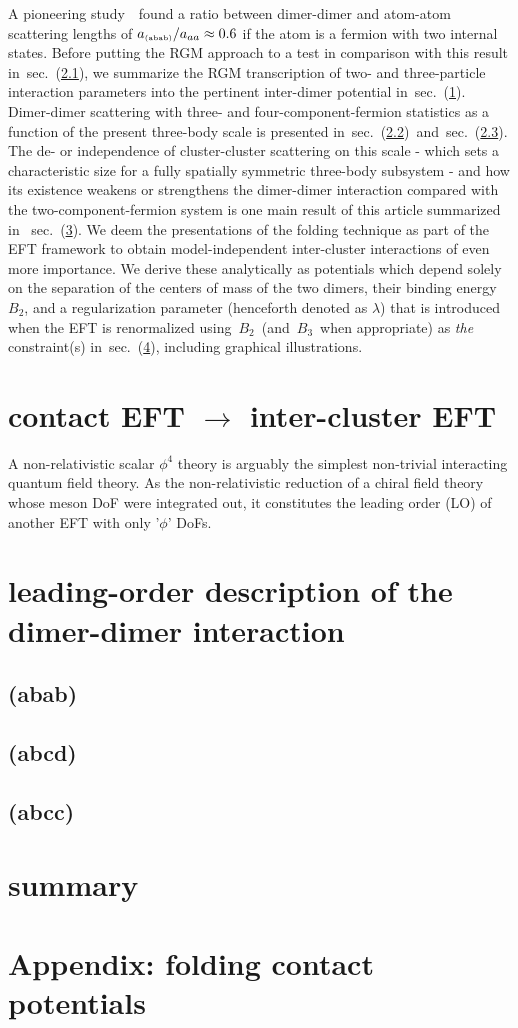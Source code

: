 \documentclass[preprint,aps,onecolumn,preprintnumbers,amsmath,amssymb,nofootinbib,superscriptaddress]{revtex4-1}
\newcommand{\secref}[1]{sec.~(\ref{#1})}
\newcommand{\add}{\ensuremath{a_\text{\tiny (abab)}}}
\newcommand{\bd}{\ensuremath{B_2}}
\newcommand{\bt}{\ensuremath{B_3}}
\begin{document}
A pioneering study~\cite{Petrov_2004}~found a ratio between dimer-dimer and atom-atom scattering lengths of $\add/a_{aa}\approx0.6$ if the
atom is a fermion with two internal states. Before putting the RGM approach to a test in comparison with this result in~\secref{sec.3}, we summarize the
RGM transcription of two- and three-particle interaction parameters into the pertinent inter-dimer potential in~\secref{sec.2}.
Dimer-dimer scattering with three- and four-component-fermion statistics 
as a function of the present three-body scale is presented in~\secref{sec.4}~and~\secref{sec.5}.
The de- or independence of cluster-cluster scattering on this scale - which sets a characteristic size for a fully spatially symmetric three-body subsystem
- and how its
existence weakens or strengthens the dimer-dimer interaction compared with the two-component-fermion system is one main result of this article summarized in
~\secref{sec.7}.
We deem the presentations of the folding technique as part of the EFT framework to obtain model-independent inter-cluster interactions of even more importance.
We derive these analytically as potentials which depend solely on the separation of the centers of mass of the two dimers, their binding
energy~\bd, and a regularization parameter (henceforth denoted as $\lambda$) that is introduced when the EFT is renormalized using~\bd~(and~\bt~when
appropriate) as {\it the} constraint(s) in~\secref{sec.6}, including graphical illustrations.


\section{contact EFT $\to$ inter-cluster EFT}\label{sec.2}
A non-relativistic scalar $\phi^4$ theory is arguably the simplest non-trivial interacting quantum field theory. As the non-relativistic
reduction of a chiral field theory whose meson DoF were integrated out, it constitutes the leading order (LO) of another EFT with only '$\phi$'
DoFs. 


\section{leading-order description of the dimer-dimer interaction}

\subsection{(abab)}\label{sec.3}
\subsection{(abcd)}\label{sec.4}
\subsection{(abcc)}\label{sec.5}

\section{summary}\label{sec.7}

\section{Appendix: folding contact potentials}\label{sec.6}



\end{document}
